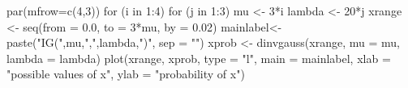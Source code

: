 \begin{Schunk}
\begin{Sinput}
 par(mfrow=c(4,3))
 for (i in 1:4){
      for (j in 1:3) {
          mu <- 3*i
          lambda <- 20*j
          xrange <- seq(from = 0.0, to = 3*mu, by = 0.02)
          mainlabel<- paste("IG(",mu,",",lambda,")", sep = "")
          xprob <- dinvgauss(xrange, mu = mu, lambda = lambda)
          plot(xrange, xprob, type = "l", main = mainlabel, xlab = "possible values of x", ylab = "probability of x")
      }
  }
\end{Sinput}
\end{Schunk}
